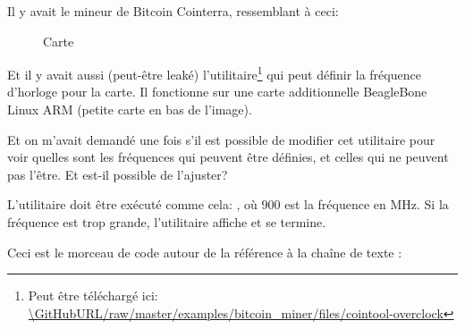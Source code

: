 
Il y avait le mineur de Bitcoin Cointerra, ressemblant à ceci:

\begin{figure}[H]
\centering
{}
\caption{Carte}
\end{figure}

Et il y avait aussi (peut-être leaké) l'utilitaire\footnote{Peut être téléchargé ici: \url{\GitHubURL/raw/master/examples/bitcoin_miner/files/cointool-overclock}}
qui peut définir la fréquence d'horloge pour la carte.
Il fonctionne sur une carte additionnelle BeagleBone Linux ARM (petite carte en bas
de l'image).

Et on m'avait demandé une fois s'il est possible de modifier cet utilitaire pour voir
quelles sont les fréquences qui peuvent être définies, et celles qui ne peuvent pas
l'être.
Et est-il possible de l'ajuster?

L'utilitaire doit être exécuté comme cela: , où 900
est la fréquence en MHz.
Si la fréquence est trop grande, l'utilitaire affiche  et
se termine.

Ceci est le morceau de code autour de la référence à la chaîne de texte :


